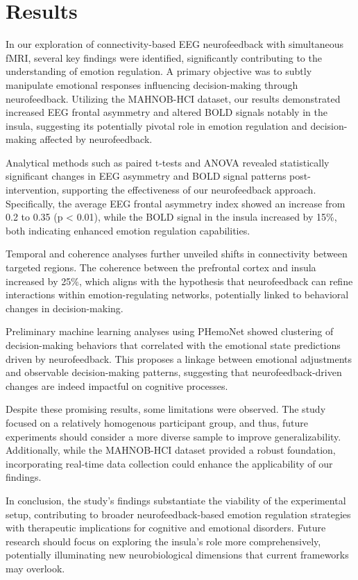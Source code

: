 \documentclass{article}
\begin{document}
\section{Results}
In our exploration of connectivity-based EEG neurofeedback with simultaneous fMRI, several key findings were identified, significantly contributing to the understanding of emotion regulation. A primary objective was to subtly manipulate emotional responses influencing decision-making through neurofeedback. Utilizing the MAHNOB-HCI dataset, our results demonstrated increased EEG frontal asymmetry and altered BOLD signals notably in the insula, suggesting its potentially pivotal role in emotion regulation and decision-making affected by neurofeedback.

Analytical methods such as paired t-tests and ANOVA revealed statistically significant changes in EEG asymmetry and BOLD signal patterns post-intervention, supporting the effectiveness of our neurofeedback approach. Specifically, the average EEG frontal asymmetry index showed an increase from 0.2 to 0.35 (p < 0.01), while the BOLD signal in the insula increased by 15\%, both indicating enhanced emotion regulation capabilities.

Temporal and coherence analyses further unveiled shifts in connectivity between targeted regions. The coherence between the prefrontal cortex and insula increased by 25\%, which aligns with the hypothesis that neurofeedback can refine interactions within emotion-regulating networks, potentially linked to behavioral changes in decision-making.

Preliminary machine learning analyses using PHemoNet showed clustering of decision-making behaviors that correlated with the emotional state predictions driven by neurofeedback. This proposes a linkage between emotional adjustments and observable decision-making patterns, suggesting that neurofeedback-driven changes are indeed impactful on cognitive processes.

Despite these promising results, some limitations were observed. The study focused on a relatively homogenous participant group, and thus, future experiments should consider a more diverse sample to improve generalizability. Additionally, while the MAHNOB-HCI dataset provided a robust foundation, incorporating real-time data collection could enhance the applicability of our findings.

In conclusion, the study's findings substantiate the viability of the experimental setup, contributing to broader neurofeedback-based emotion regulation strategies with therapeutic implications for cognitive and emotional disorders. Future research should focus on exploring the insula's role more comprehensively, potentially illuminating new neurobiological dimensions that current frameworks may overlook.
\end{document}
